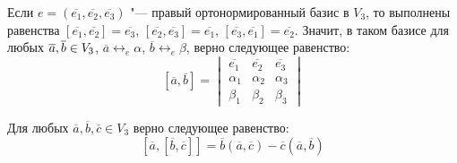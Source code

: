     \begin{note}
    	Если $e = (\overline{e_1}, \overline{e_2}, \overline{e_3})$ "--- правый ортонормированный базис в $V_3$, то выполнены равенства $[\overline{e_1}, \overline{e_2}] = \overline{e_3}$, $[\overline{e_2}, \overline{e_3}] = \overline{e_1}$, $[\overline{e_3}, \overline{e_1}] = \overline{e_2}$. Значит, в таком базисе для любых $\overline{a}, \overline{b} \hm{\in} V_3$, $\overline{a} \leftrightarrow_{e} \alpha$, $\overline{b} \leftrightarrow_{e} \beta$, верно следующее равенство:
    	\[[\overline{a}, \overline{b}] =
    	\begin{vmatrix}
    	\overline{e_1} & \overline{e_2} & \overline{e_3}\\
    	\alpha_1 & \alpha_2 & \alpha_3\\
    	\beta_1 & \beta_2 & \beta_3
    	\end{vmatrix}\]
    \end{note}
    
    \begin{theorem}
    	Для любых $\overline a, \overline b, \overline c \in V_3$ верно следующее равенство:
    	\[[\overline{a}, [\overline{b}, \overline{c}]] = \overline{b}(\overline{a}, \overline{c}) - \overline{c}(\overline{a}, \overline{b})\]
    \end{theorem}
    
